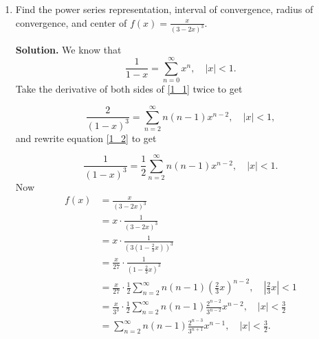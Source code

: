 \documentclass[9pt]{article}
\begin{document}
\begin{enumerate}
   \item Find the power series representation, interval of convergence, radius
         of convergence, and center of $f(x) = \frac{x}{(3-2x)^3}$.
   
         \textbf{Solution.} We know that
         \begin{equation} \label{1_1}
            \frac{1}{1-x} = \sum_{n=0}^\infty x^n, \quad |x| < 1.
         \end{equation}
         Take the derivative of both sides of \eqref{1_1} twice to get
         
         \begin{equation} \label{1_2}
            \frac{2}{(1-x)^3} = \sum_{n=2}^\infty n(n-1)x^{n-2}, \quad |x| < 1,
         \end{equation}
         and rewrite equation \eqref{1_2} to get
         
         \begin{equation} \label{1_3}
            \frac{1}{(1-x)^3} = \frac{1}{2}\sum_{n=2}^\infty n(n-1)x^{n-2}, \quad |x| < 1.
         \end{equation}
         Now
         \begin{align*}
            f(x) &= \frac{x}{(3-2x)^3} \\
               &= x \cdot \frac{1}{(3-2x)^3} \\
               &= x \cdot \frac{1}{(3\left(1-\frac{2}{3}x\right))^3} \\
               &= \frac{x}{27} \cdot \frac{1}{(1-\frac{2}{3}x)^3} \\
               &= \frac{x}{27} \cdot \frac{1}{2}\sum_{n=2}^\infty n(n-1)\left(\frac{2}{3}x\right)^{n-2}, \quad \left|\frac{2}{3}x\right| < 1 \\
               &= \frac{x}{3^3} \cdot \frac{1}{2}\sum_{n=2}^\infty n(n-1)\frac{2^{n-2}}{3^{n-2}}x^{n-2}, \quad |x| < \frac{3}{2}\\
               &= \sum_{n=2}^\infty n(n-1)\frac{2^{n-3}}{3^{n+1}}x^{n-1}, \quad |x| < \frac{3}{2}.
         \end{align*}
\end{enumerate}
\end{document}
